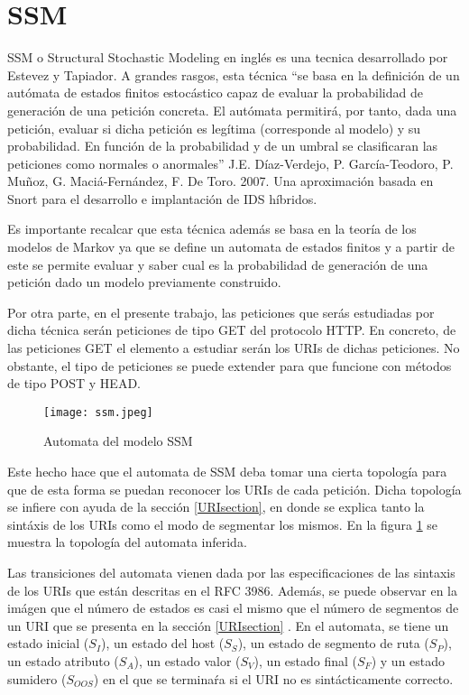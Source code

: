 \section{SSM}

SSM o Structural Stochastic Modeling en ingl\'es es una tecnica desarrollado por Estevez y Tapiador. A grandes rasgos, esta t\'ecnica “se basa en la definición de un autómata de estados finitos estocástico capaz de evaluar la probabilidad de generación de una petición concreta. El autómata permitirá, por tanto, dada una petición, evaluar si dicha petición es legítima (corresponde al modelo) y su probabilidad. En función de la probabilidad y de un umbral se clasificaran las peticiones como normales o anormales” J.E. Díaz-Verdejo, P. García-Teodoro, P. Muñoz, G. Maciá-Fernández, F. De Toro. 2007. Una aproximación basada en Snort para el desarrollo e implantación de IDS híbridos.

Es importante recalcar que esta t\'ecnica adem\'as se basa en la teor\'ia de los modelos de Markov ya que se define un automata de estados finitos y a partir de este se permite evaluar y saber cual es la probabilidad de generaci\'on de una petici\'on dado un modelo previamente construido.

Por otra parte, en el presente trabajo, las peticiones que ser\'as estudiadas por dicha t\'ecnica ser\'an peticiones de tipo GET del protocolo HTTP. En concreto, de las peticiones GET el elemento a estudiar ser\'an los URIs de dichas peticiones. No obstante, el tipo de peticiones se puede extender para que funcione con m\'etodos de tipo POST y HEAD. 

\begin{figure}

  \texttt{[image: ssm.jpeg]}
  \caption{Automata del modelo SSM}
  \label{fig:ssm}

\end{figure}

Este hecho hace que el automata de SSM deba tomar una cierta topolog\'ia para que de esta forma se puedan reconocer los URIs de cada petici\'on. Dicha topolog\'ia se infiere con ayuda de la sección \ref{URIsection}, en donde se explica tanto la sint\'axis de los URIs como el modo de segmentar los mismos. En la figura \ref{fig:ssm} se muestra la topolog\'ia del automata inferida.

Las transiciones del automata vienen dada por las especificaciones de las sintaxis de los URIs que est\'an descritas en el RFC 3986. Adem\'as, se puede observar en la im\'agen que el n\'umero de estados es casi el mismo que el n\'umero de segmentos de un URI que se presenta en la secci\'on \ref{URIsection} . En el automata, se tiene un estado inicial ($S_{I}$), un estado del host ($S_{S}$), un estado de segmento de ruta ($S_{P}$), un estado atributo ($S_{A}$), un estado valor ($S_{V}$), un estado final ($S_{F}$) y un estado sumidero ($S_{OOS}$) en el que se termina\'ra si el URI no es sint\'acticamente correcto.

